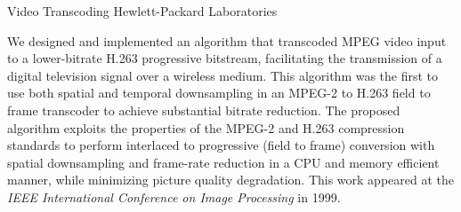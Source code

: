 \documentclass{article}
\begin{document}
\begin{cv}{}
{\mf Video Transcoding} \hfill Hewlett-Packard Laboratories
\vspace*{-0.1in}

    We designed and implemented an algorithm that transcoded MPEG video
    input to a lower-bitrate H.263 progressive bitstream, facilitating
    the transmission of a digital television signal over a wireless
    medium.  This algorithm was the first
    to use both spatial and temporal downsampling in an MPEG-2 to H.263
    field to frame transcoder to achieve substantial bitrate reduction.
    The proposed algorithm exploits the properties of the MPEG-2 and
    H.263 compression standards to perform interlaced to progressive
    (field to frame) conversion with spatial downsampling and frame-rate
    reduction in a CPU and memory efficient manner, while
    minimizing picture quality degradation.  This work appeared at the
    {\em IEEE International Conference on Image Processing} in 1999.




\end{cv}
\end{document}
